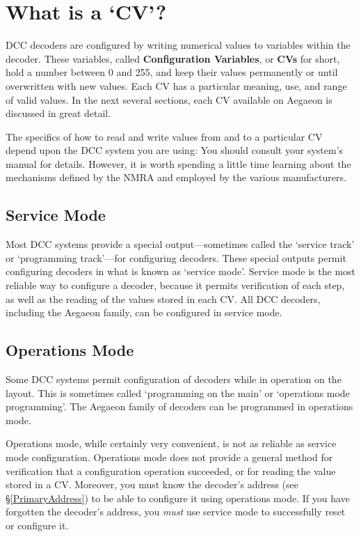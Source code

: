 \documentclass[12pt,letterpaper,draft]{memoir} %
\begin{document}
\section{What is a `CV'?}
\label{WhatIsACV}
DCC decoders are configured by writing numerical values to variables within the decoder. These variables, called \textbf{Configuration Variables}, or \textbf{CVs} for short, hold a number between 0 and 255, and keep their values permanently or until overwritten with new values. Each CV has a particular meaning, use, and range of valid values. In the next several sections, each CV available on Aegaeon is discussed in great detail.

The specifics of how to read and write values from and to a particular CV depend upon the DCC system you are using: You should consult your system's manual for details. However, it is worth spending a little time learning about the mechanisms defined by the NMRA and employed by the various manufacturers.

\subsection{Service Mode}

Most DCC systems provide a special output---sometimes called the `service track' or `programming track'---for configuring decoders. These special outputs permit configuring decoders in what is known as `service mode'. Service mode is the most reliable way to configure a decoder, because it permits verification of each step, as well as the reading of the values stored in each CV. All DCC decoders, including the Aegaeon family, can be configured in service mode.

\subsection{Operations Mode}

Some DCC systems permit configuration of decoders while in operation on the layout. This is sometimes called `programming on the main' or `operations mode programming'. The Aegaeon family of decoders can be programmed in operations mode.

Operations mode, while certainly very convenient, is not as reliable as service mode configuration. Operations mode does not provide a general method for verification that a configuration operation succeeded, or for reading the value stored in a CV. Moreover, you must know the decoder's address (see \S\ref{PrimaryAddress}) to be able to configure it using operations mode. If you have forgotten the decoder's address, you \textit{must} use service mode to successfully reset or configure it.
\end{document}
